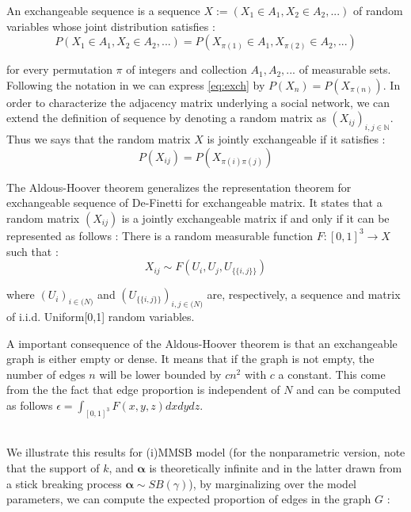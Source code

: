 \documentclass{llncs}
\begin{document}
An exchangeable sequence is a sequence $X := (X_1 \in A_1, X_2 \in A_2,...)$ of random variables whose joint distribution satisfies :
\begin{equation}\label{eq:exch}
P(X_1 \in A_1, X_2 \in A_2,...) = P(X_{\pi(1)} \in A_1, X_{\pi(2)} \in A_2,...)
\end{equation}

for every permutation $\pi$  of integers and collection $A_1, A_2,...$ of measurable sets. Following the notation in \cite{orbanz2015bayesian} we can express \eqref{eq:exch} by $P(X_n) = P(X_{\pi(n)})$. In order to characterize the adjacency matrix underlying a social network, we can extend the definition of sequence by denoting a random matrix as $(X_{ij})_{i,j \in \mathbb{N}}$. Thus we says that the random matrix $X$ is jointly exchangeable if it satisfies :
	\begin{equation}
	P(X_{ij}) = P(X_{\pi(i)\pi(j)})
	\end{equation}
	
The Aldous-Hoover theorem generalizes the representation theorem for exchangeable sequence of De-Finetti for exchangeable matrix. It states that a random matrix $(X_{ij})$ is a jointly exchangeable matrix if and only if it can be represented as follows : There is a random measurable function $F:[0,1]^3 \rightarrow X$ such that : 
\begin{equation}
X_{ij} \sim F(U_i, U_j, U_{\{\{i,j\}\}})
\end{equation}

where $(U_i)_{i\in \mathbb(N)}$ and $(U_{\{\{i,j\}\}})_{i, j\in \mathbb(N)}$ are, respectively, a sequence and matrix of i.i.d. Uniform[0,1] random variables.

A important consequence of the Aldous-Hoover theorem is that an exchangeable graph is either empty or dense. It means that if the graph is not empty, the number of edges $n$ will be lower bounded by $cn^2$ with $c$ a constant. This  come from the the fact that edge proportion is independent of $N$ and can be computed as follows $\epsilon = \int_{[0,1]^3} F(x, y, z)dxdydz$.

~\\
We illustrate this results for (i)MMSB model (for the nonparametric version, note that the support of $k$, and $\bm\alpha$ is theoretically infinite and in the latter drawn from a stick breaking process  $\bm \alpha \sim SB(\gamma)$), by marginalizing over the model parameters, we can compute the expected proportion of edges in the graph $G$ :
\end{document}
